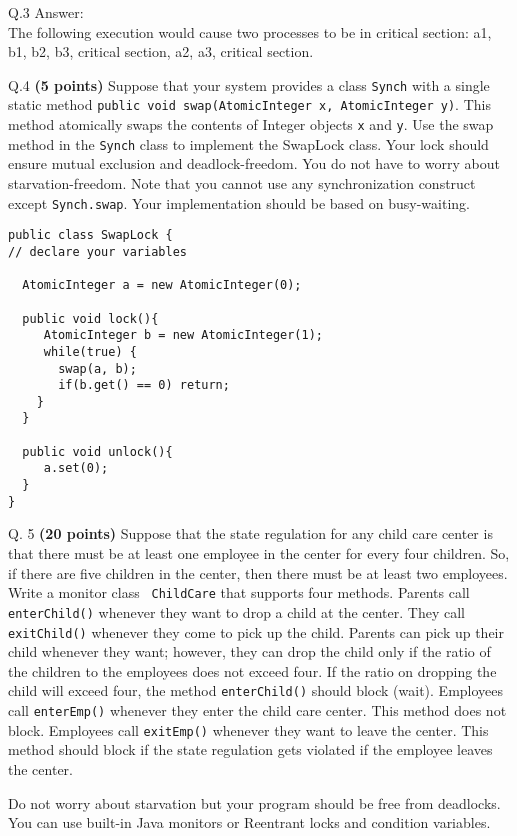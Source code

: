 \documentclass[10pt]{article}
\begin{document}
Q.3 Answer:\\
The following execution would cause two processes to be in critical section:
a1, b1, b2, b3, critical section, a2, a3, critical section.


\pagebreak

\noindent
Q.4 {\bf (5 points)}
Suppose that your system provides a class {\tt Synch} with a single static method
{\tt public void swap(AtomicInteger x, AtomicInteger y)}. This method atomically swaps the contents of Integer objects {\tt x} and {\tt y}.
Use the swap method in the {\tt Synch} class to implement the SwapLock class.
Your lock should ensure mutual exclusion and deadlock-freedom. You do not have to worry
about starvation-freedom. Note that you cannot use any synchronization construct except
{\tt Synch.swap}. Your implementation should be based on busy-waiting.
\begin{verbatim}
public class SwapLock {
// declare your variables

  AtomicInteger a = new AtomicInteger(0);

  public void lock(){
     AtomicInteger b = new AtomicInteger(1);
     while(true) {
       swap(a, b);
       if(b.get() == 0) return;
    }
  }

  public void unlock(){
     a.set(0);
  }
}

\end{verbatim}

\pagebreak

\noindent
Q. 5 {\bf (20 points)}
Suppose that the state regulation for any child care center is that there must be at least one employee in the
center for every four children. So, if there are five children in the center, then there must be at least two employees.
Write a monitor class {\tt
ChildCare} that supports four methods. Parents call {\tt enterChild()} whenever they want to drop
a child at the center. They call {\tt exitChild()} whenever they come to pick up the child.
Parents can pick up their child whenever they want; however, they can drop the child only if
the ratio of the children to the employees does not exceed four. If the ratio on dropping the child
will exceed four, the method {\tt enterChild()} should block (wait).
Employees call {\tt enterEmp()} whenever they enter the child care center.
This method does not block. Employees call {\tt exitEmp()} whenever they want to leave the center.
This method should block if the state regulation gets violated if the employee leaves the center.

Do not worry about starvation but your program should be free from deadlocks.
You can use built-in Java monitors or Reentrant locks and condition variables.
\end{document}
